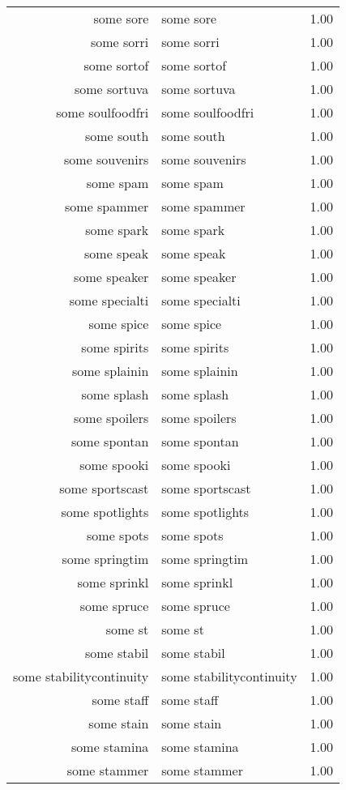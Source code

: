 \begin{table}[ht]
\begin{tabular}{rlr}
  some sore & some sore & 1.00 \\ 
  some sorri & some sorri & 1.00 \\ 
  some sortof & some sortof & 1.00 \\ 
  some sortuva & some sortuva & 1.00 \\ 
  some soulfoodfri & some soulfoodfri & 1.00 \\ 
  some south & some south & 1.00 \\ 
  some souvenirs & some souvenirs & 1.00 \\ 
  some spam & some spam & 1.00 \\ 
  some spammer & some spammer & 1.00 \\ 
  some spark & some spark & 1.00 \\ 
  some speak & some speak & 1.00 \\ 
  some speaker & some speaker & 1.00 \\ 
  some specialti & some specialti & 1.00 \\ 
  some spice & some spice & 1.00 \\ 
  some spirits & some spirits & 1.00 \\ 
  some splainin & some splainin & 1.00 \\ 
  some splash & some splash & 1.00 \\ 
  some spoilers & some spoilers & 1.00 \\ 
  some spontan & some spontan & 1.00 \\ 
  some spooki & some spooki & 1.00 \\ 
  some sportscast & some sportscast & 1.00 \\ 
  some spotlights & some spotlights & 1.00 \\ 
  some spots & some spots & 1.00 \\ 
  some springtim & some springtim & 1.00 \\ 
  some sprinkl & some sprinkl & 1.00 \\ 
  some spruce & some spruce & 1.00 \\ 
  some st & some st & 1.00 \\ 
  some stabil & some stabil & 1.00 \\ 
  some stabilitycontinuity & some stabilitycontinuity & 1.00 \\ 
  some staff & some staff & 1.00 \\ 
  some stain & some stain & 1.00 \\ 
  some stamina & some stamina & 1.00 \\ 
  some stammer & some stammer & 1.00 \\ 

\end{tabular}
\end{table}
